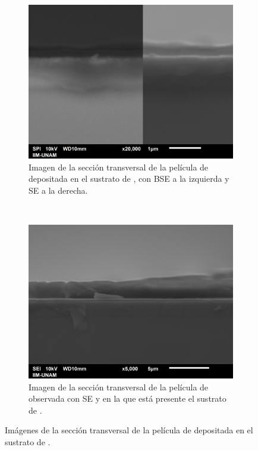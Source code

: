 \documentclass[12pt]{IEEEtran}
\begin{document}
\begin{figure}[ht]
	\centering
	\begin{subfigure}[b]{0.45\textwidth}
		\centering
		\includegraphics[width=\linewidth]{Al-transv-0004.png}
		\caption{Imagen de la sección transversal de la película de  depositada en el sustrato de , con BSE a la izquierda y SE a la derecha.}
	\end{subfigure}%
	~
	\begin{subfigure}[b]{0.45\textwidth}
		\centering
		\includegraphics[width=\linewidth]{Al-transv-0008.png}
		\caption{Imagen de la sección transversal de la película de  observada con SE y en la que está presente el sustrato de .}
	\end{subfigure}
	\caption{Imágenes de la sección transversal de la película de  depositada en el sustrato de .}
	\label{fig:SEM-trans}
\end{figure}
\end{document}
